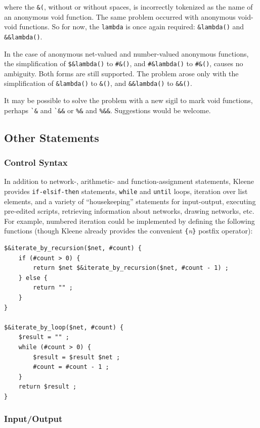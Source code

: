 \documentclass[letterpaper,12pt]{article}
\newcommand{\Kleene}{Kleene\xspace}
\begin{document}
\noindent
where the \verb!&(!, without or without spaces, is incorrectly tokenized
as the name of an anonymous void function.  The same problem occurred with
anonymous void-void functions.  So for now, the \texttt{lambda} is once
again required:  \verb!&lambda()! and \verb!&&lambda()!.

In the case of anonymous net-valued and number-valued anonymous functions,
the simplification of \verb!$&lambda()! to \verb!#&()!, and
\verb!#&lambda()! to \verb!#&()!, causes no ambiguity.  Both forms are
still supported.  The problem arose only with the simplification of
\verb!&lambda()! to \verb!&()!, and \verb!&&lambda()! to \verb!&&()!.

It may be possible to solve the problem with a new sigil to mark void
functions, perhaps \verb!`&! and \verb!`&&! or \verb!%&! and \verb!%&&!.
Suggestions would be welcome.

\subsection{Other Statements}

\subsubsection{Control Syntax}

In addition to network-, arithmetic- and function-assignment statements,
\Kleene{} provides \verb!if-elsif-then! statements, \verb!while!  and
\verb!until!  loops, iteration over list elements, and a variety of
``housekeeping'' statements for input-output, executing pre-edited
scripts, retrieving information about networks, drawing networks, etc.
For example, numbered iteration could be implemented by defining the
following functions (though \Kleene{} already provides the convenient
\verb!{!\emph{n}\verb!}! postfix operator):

\begin{Verbatim}[fontsize=\small]
$&iterate_by_recursion($net, #count) {
    if (#count > 0) {
        return $net $&iterate_by_recursion($net, #count - 1) ;
    } else {
        return "" ;
    }
}

$&iterate_by_loop($net, #count) {
    $result = "" ;
    while (#count > 0) {
        $result = $result $net ;
        #count = #count - 1 ;
    }
    return $result ;
}
\end{Verbatim}

\subsubsection{Input/Output}
\end{document}
